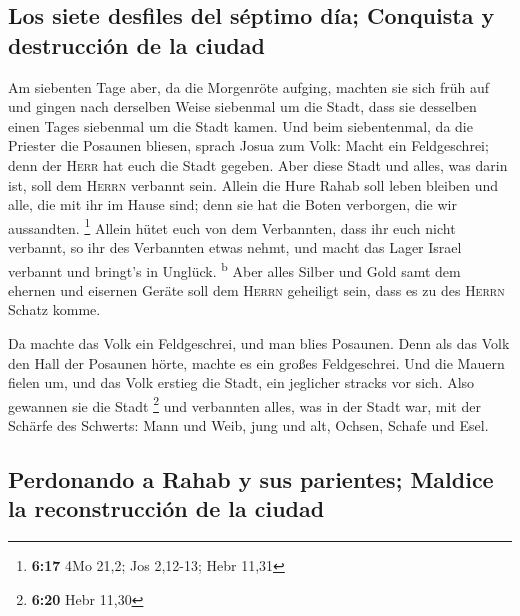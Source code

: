 \hypertarget{los-siete-desfiles-del-suxe9ptimo-duxeda-conquista-y-destrucciuxf3n-de-la-ciudad}{%
\subsection{Los siete desfiles del séptimo día; Conquista y destrucción
de la
ciudad}\label{los-siete-desfiles-del-suxe9ptimo-duxeda-conquista-y-destrucciuxf3n-de-la-ciudad}}

 Am siebenten Tage aber, da die Morgenröte aufging,
machten sie sich früh auf und gingen nach derselben Weise siebenmal um
die Stadt, dass sie desselben einen Tages siebenmal um die Stadt kamen.
 Und beim siebentenmal, da die Priester die Posaunen
bliesen, sprach Josua zum Volk: Macht ein Feldgeschrei; denn der
\textsc{Herr} hat euch die Stadt gegeben.  Aber diese
Stadt und alles, was darin ist, soll dem \textsc{Herrn} verbannt sein.
Allein die Hure Rahab soll leben bleiben und alle, die mit ihr im Hause
sind; denn sie hat die Boten verborgen, die wir aussandten. \footnote{\textbf{6:17}
  4Mo 21,2; Jos 2,12-13; Hebr 11,31}  Allein hütet euch
von dem Verbannten, dass ihr euch nicht verbannt, so ihr des Verbannten
etwas nehmt, und macht das Lager Israel verbannt und bringt's in
Unglück. \textsuperscript{b}  Aber alles Silber und Gold
samt dem ehernen und eisernen Geräte soll dem \textsc{Herrn} geheiligt
sein, dass es zu des \textsc{Herrn} Schatz komme.

 Da machte das Volk ein Feldgeschrei, und man blies
Posaunen. Denn als das Volk den Hall der Posaunen hörte, machte es ein
großes Feldgeschrei. Und die Mauern fielen um, und das Volk erstieg die
Stadt, ein jeglicher stracks vor sich. Also gewannen sie die Stadt
\footnote{\textbf{6:20} Hebr 11,30}  und verbannten
alles, was in der Stadt war, mit der Schärfe des Schwerts: Mann und
Weib, jung und alt, Ochsen, Schafe und Esel.

\hypertarget{perdonando-a-rahab-y-sus-parientes-maldice-la-reconstrucciuxf3n-de-la-ciudad}{%
\subsection{Perdonando a Rahab y sus parientes; Maldice la
reconstrucción de la
ciudad}\label{perdonando-a-rahab-y-sus-parientes-maldice-la-reconstrucciuxf3n-de-la-ciudad}}

